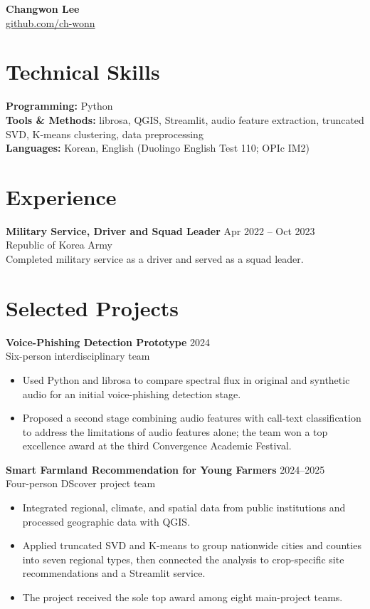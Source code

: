 \documentclass[10pt,a4paper]{article}
\begin{document}
\begin{center}
    {\LARGE\bfseries Changwon Lee}\\[3pt]
    \href{https://github.com/ch-wonn}{github.com/ch-wonn}
\end{center}

\section*{Technical Skills}
\textbf{Programming:} Python\\
\textbf{Tools \& Methods:} librosa, QGIS, Streamlit, audio feature extraction, truncated SVD, K-means clustering, data preprocessing\\
\textbf{Languages:} Korean, English (Duolingo English Test 110; OPIc IM2)

\section*{Experience}
\textbf{Military Service, Driver and Squad Leader} \hfill Apr 2022 -- Oct 2023\\
Republic of Korea Army\\
Completed military service as a driver and served as a squad leader.

\section*{Selected Projects}
\textbf{Voice-Phishing Detection Prototype} \hfill 2024\\
Six-person interdisciplinary team
\begin{itemize}
    \item Used Python and librosa to compare spectral flux in original and synthetic audio for an initial voice-phishing detection stage.
    \item Proposed a second stage combining audio features with call-text classification to address the limitations of audio features alone; the team won a top excellence award at the third Convergence Academic Festival.
\end{itemize}

\textbf{Smart Farmland Recommendation for Young Farmers} \hfill 2024--2025\\
Four-person DScover project team
\begin{itemize}
    \item Integrated regional, climate, and spatial data from public institutions and processed geographic data with QGIS.
    \item Applied truncated SVD and K-means to group nationwide cities and counties into seven regional types, then connected the analysis to crop-specific site recommendations and a Streamlit service.
    \item The project received the sole top award among eight main-project teams.
\end{itemize}
\end{document}
